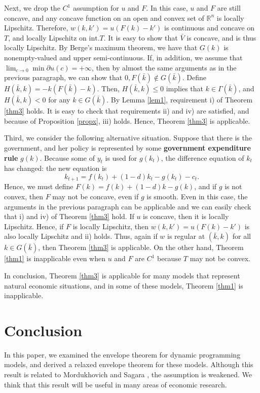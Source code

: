 \documentclass[a4paper,12pt]{article}
\theoremstyle{definition}
\begin{document}
Next, we drop the $C^1$ assumption for $u$ and $F$. In this case, $u$ and $F$ are still concave, and any concave function on an open and convex set of $\mathbb{R}^n$ is locally Lipschitz. Therefore, $w(k,k')=u(F(k)-k')$ is continuous and concave on $T$, and locally Lipschitz on $\mbox{int.}T$. It is easy to show that $\bar{V}$ is concave, and is thus locally Lipschitz. By Berge's maximum theorem, we have that $G(k)$ is nonempty-valued and upper semi-continuous. If, in addition, we assume that $\lim_{c\to 0}\min \partial u(c)=+\infty$, then by almost the same arguments as in the previous paragraph, we can show that $0,F(\bar{k})\notin G(\bar{k})$. Define $H(\bar{k},k)=-k(F(\bar{k})-k)$. Then, $H(\bar{k},k)\le 0$ implies that $k\in \Gamma(\bar{k})$, and $H(\bar{k},k)<0$ for any $k\in G(\bar{k})$. By Lemma \ref{lem1}, requirement i) of Theorem \ref{thm3} holds. It is easy to check that requirements ii) and iv) are satisfied, and because of Proposition \ref{propx}, iii) holds. Hence, Theorem \ref{thm3} is applicable.

Third, we consider the following alternative situation. Suppose that there is the government, and her policy is represented by some {\bf government expenditure rule} $g(k)$. Because some of $y_t$ is used for $g(k_t)$, the difference equation of $k_t$ has changed: the new equation is
\[k_{t+1}=f(k_t)+(1-d)k_t-g(k_t)-c_t.\]
Hence, we must define $F(k)=f(k)+(1-d)k-g(k)$, and if $g$ is not convex, then $F$ may not be concave, even if $g$ is smooth. Even in this case, the arguments in the previous paragraph can be applicable and we can easily check that i) and iv) of Theorem \ref{thm3} hold. If $u$ is concave, then it is locally Lipschitz. Hence, if $F$ is locally Lipschitz, then $w(k,k')=u(F(k)-k')$ is also locally Lipschitz and ii) holds. Thus, again if $w$ is regular at $(\bar{k},k)$ for all $k\in G(\bar{k})$, then Theorem \ref{thm3} is applicable. On the other hand, Theorem \ref{thm1} is inapplicable even when $u$ and $F$ are $C^1$ because $T$ may not be convex.

In conclusion, Theorem \ref{thm3} is applicable for many models that represent natural economic situations, and in some of these models, Theorem \ref{thm1} is inapplicable.


\section{Conclusion}
In this paper, we examined the envelope theorem for dynamic programming models, and derived a relaxed envelope theorem for these models. Although this result is related to Mordukhovich and Sagara \cite{MS}, the assumption is weakened. We think that this result will be useful in many areas of economic research.
\end{document}
